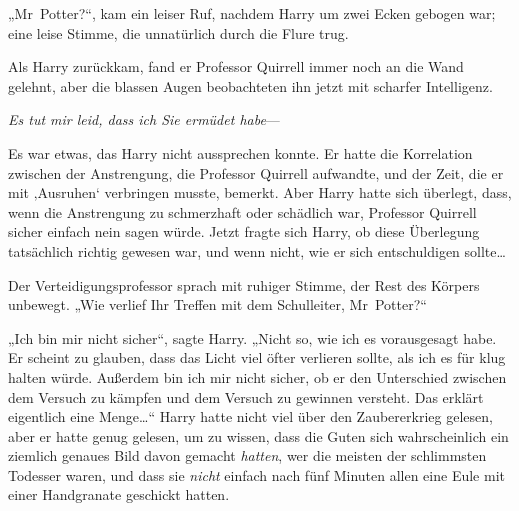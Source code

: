 „Mr~Potter?“, kam ein leiser Ruf, nachdem Harry um zwei Ecken gebogen war; eine leise Stimme, die unnatürlich durch die Flure trug.

Als Harry zurückkam, fand er Professor Quirrell immer noch an die Wand gelehnt, aber die blassen Augen beobachteten ihn jetzt mit scharfer Intelligenz.

\emph{Es tut mir leid, dass ich Sie ermüdet habe}—

Es war etwas, das Harry nicht aussprechen konnte. Er hatte die Korrelation zwischen der Anstrengung, die Professor Quirrell aufwandte, und der Zeit, die er mit ‚Ausruhen‘ verbringen musste, bemerkt. Aber Harry hatte sich überlegt, dass, wenn die Anstrengung zu schmerzhaft oder schädlich war, Professor Quirrell sicher einfach nein sagen würde. Jetzt fragte sich Harry, ob diese Überlegung tatsächlich richtig gewesen war, und wenn nicht, wie er sich entschuldigen sollte…

Der Verteidigungsprofessor sprach mit ruhiger Stimme, der Rest des Körpers unbewegt.
„Wie verlief Ihr Treffen mit dem Schulleiter, Mr~Potter?“

„Ich bin mir nicht sicher“, sagte Harry.
„Nicht so, wie ich es vorausgesagt habe. Er scheint zu glauben, dass das Licht viel öfter verlieren sollte, als ich es für klug halten würde. Außerdem bin ich mir nicht sicher, ob er den Unterschied zwischen dem Versuch zu kämpfen und dem Versuch zu gewinnen versteht. Das erklärt eigentlich eine Menge…“ Harry hatte nicht viel über den Zaubererkrieg gelesen, aber er hatte genug gelesen, um zu wissen, dass die Guten sich wahrscheinlich ein ziemlich genaues Bild davon gemacht \emph{hatten}, wer die meisten der schlimmsten Todesser waren, und dass sie \emph{nicht} einfach nach fünf Minuten allen eine Eule mit einer Handgranate geschickt hatten.

